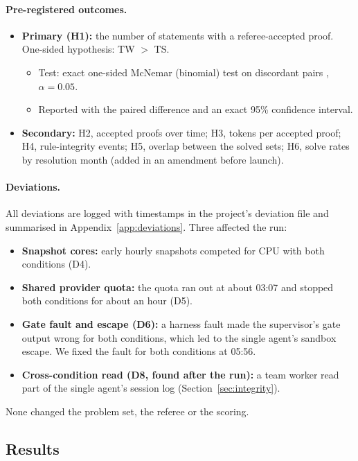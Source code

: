 \documentclass[11pt]{article}
\begin{document}
\paragraph{Pre-registered outcomes.}
\begin{itemize}
  \item \textbf{Primary (H1):} the number of statements with a referee-accepted proof. One-sided hypothesis: TW $>$ TS.
    \begin{itemize}
      \item Test: exact one-sided McNemar (binomial) test on discordant pairs \citep{mcnemar1947}, $\alpha=0.05$.
      \item Reported with the paired difference and an exact 95\% confidence interval.
    \end{itemize}
  \item \textbf{Secondary:} H2, accepted proofs over time; H3, tokens per accepted proof; H4, rule-integrity events;
    H5, overlap between the solved sets; H6, solve rates by resolution month (added in an amendment before launch).
\end{itemize}

\paragraph{Deviations.} All deviations are logged with timestamps in the project's deviation file and summarised in
Appendix~\ref{app:deviations}. Three affected the run:
\begin{itemize}
  \item \textbf{Snapshot cores:} early hourly snapshots competed for CPU with both conditions (D4).
  \item \textbf{Shared provider quota:} the quota ran out at about 03:07 and stopped both conditions for about an hour
    (D5).
  \item \textbf{Gate fault and escape (D6):} a harness fault made the supervisor's gate output wrong for both
    conditions, which led to the single agent's sandbox escape. We fixed the fault for both conditions at 05:56.
  \item \textbf{Cross-condition read (D8, found after the run):} a team worker read part of the single agent's session
    log (Section~\ref{sec:integrity}).
\end{itemize}
None changed the problem set, the referee or the scoring.

\subsection{Results}
\end{document}
